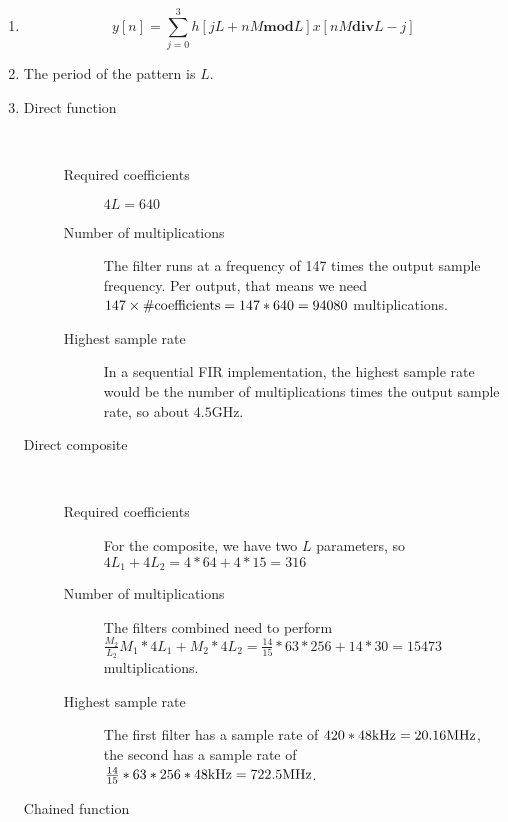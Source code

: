 
\begin{enumerate}
	\item %
		\[
			y[n] = \sum_{j=0}^3 h[jL+nM \textbf{mod} L]x[nM \textbf{div} L -j]
		\]
	\item %
		The period of the pattern is $L$.
	\item %
		\begin{description}
			\item[Direct function]\hfill\\
				\begin{description}
					\item[Required coefficients] $4L = 640$
					\item[Number of multiplications] The filter runs at a frequency of 147 times the output sample frequency. Per output, that means we need $147 \times \#\textnormal{coefficients} = 147*640 = 94080$ multiplications.
					\item[Highest sample rate] In a sequential FIR implementation, the highest sample rate would be the number of multiplications times the output sample rate, so about $4.5$GHz.
				\end{description}
			\item[Direct composite]\hfill\\
				\begin{description}
					\item[Required coefficients] For the composite, we have two $L$ parameters, so $4L_1 + 4L_2 = 4*64 + 4*15 = 316$
					\item[Number of multiplications] The filters combined need to perform $\frac{M_2}{L_2}M_1 * 4L_1 + M_2 * 4L_2 = \frac{14}{15}*63*256+14*30 = 15473$ multiplications.
					\item[Highest sample rate] The first filter has a sample rate of $420  * 48\textnormal{kHz} = 20.16\textnormal{MHz}$, the second has a sample rate of $\frac{14}{15}*63*256* 48\textnormal{kHz} = 722.5\textnormal{MHz}$.
				\end{description}
			\item[Chained function]\hfill\\

\end{description}
\end{enumerate}
